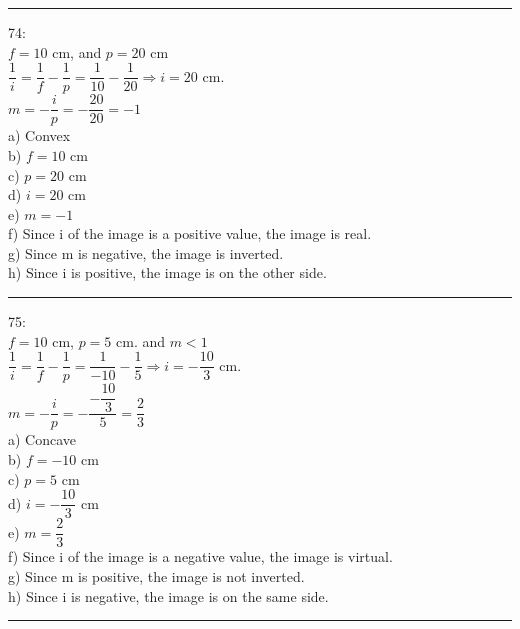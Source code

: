 \documentclass[fleqn]{article}
\begin{document}
\begin{enumerate}
    \textcolor{hwColor}{
      \rule{15cm}{0.4pt}
    }

    \textcolor{hwColor}{
      74: \\
      $f=10$ cm, and $p=20$ cm  \\
      $\dfrac{1}{i}=\dfrac{1}{f}-\dfrac{1}{p}=\dfrac{1}{10}-\dfrac{1}{20} \Longrightarrow i=20$ cm. \\
      $m=-\dfrac{i}{p}=-\dfrac{20}{20}=-1$ \\
      a) Convex \\
      b) $f=10$ cm \\
      c) $p=20$ cm \\
      d) $i=20$ cm \\
      e) $m=-1$ \\
      f) Since i of the image is a positive value, the image is real. \\
      g) Since m is negative, the image is inverted. \\
      h) Since i is positive, the image is on the other side. \\
    }

    \textcolor{hwColor}{
      \rule{15cm}{0.4pt}
    }

    \textcolor{hwColor}{
      75: \\
      $f=10$ cm, $p=5$ cm. and $m<1$  \\
      $\dfrac{1}{i}=\dfrac{1}{f}-\dfrac{1}{p}=\dfrac{1}{-10}-\dfrac{1}{5} \Longrightarrow i=-\dfrac{10}{3}$ cm. \\
      $m=-\dfrac{i}{p}=-\dfrac{-\dfrac{10}{3}}{5}=\dfrac{2}{3}$ \\
      a) Concave \\
      b) $f=-10$ cm \\
      c) $p=5$ cm \\
      d) $i=-\dfrac{10}{3}$ cm \\
      e) $m=\dfrac{2}{3}$ \\
      f) Since i of the image is a negative value, the image is virtual. \\
      g) Since m is positive, the image is not inverted. \\
      h) Since i is negative, the image is on the same side. \\
    }

    \textcolor{hwColor}{
      \rule{15cm}{0.4pt}
    }


\end{enumerate}
\end{document}
